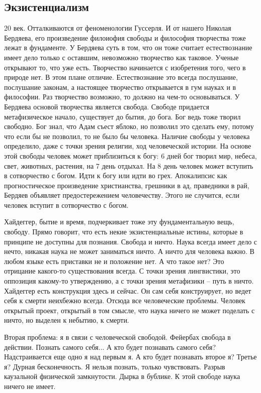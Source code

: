 \documentclass[a4paper, 12pt]{article}
\begin{document}
\subsection{Экзистенциализм}
20 век. Отталкиваются от феноменологии Гуссерля. И от нашего Николая 
Бердяева, его произведение филоиофия свободы и философия творчества тоже 
лежат в фундаменте. У Бердяева суть в том, что он тоже считает 
естествознание имеет дело только с оставшим, невозможно творчество как 
таковое. Ученые открывают то, что уже есть. Творчество начинается 
с изобретения того, чего в природе нет. В этом плане отличие. 
Естествознание это всегда послушание, послушание законам, а настоящее 
творчество открывается в гум науках и в философии. Раз творчество 
возможно, то должно на чем-то основываться. У Бердяева основой 
творчества является свобода. Свободе придается метафизическое начало, 
существует до бытия, до бога. Бог ведь тоже творил свободно. Бог знал, 
что Адам съест яблоко, но позволил это сделать ему, потому что если бы 
не позволил, то не было бы человека. Наличие свободы у человека 
определило, даже с точки зрения религии, ход человеческой истории. На 
основе этой свободы человек может приблизиться к богу: 6 дней бог творил 
мир, небеса, свет, животных, растения, на 7 день отдыхал. На 8 день 
человек может вступить в сотворчество с богом. Идти к богу или идти во 
грех. Апокалипсис как прогностическое произведение христианства, 
грешники в ад, праведники в рай, Бердяев объявляет предостережением 
человечеству. Этого не случится, если человек вступит в сотворчество 
с богом.

Хайдеггер, бытие и время, подчеркивает тоже эту фундаментальную вещь, 
свободу. Прямо говорит, что есть некие экзистенциальные истины, которые 
в принципе не доступны для познания. Свобода и ничто. Наука всегда имеет 
дело с нечто, никакая наука не может заниматься ничто. А ничто для 
человека важно. В любом языке есть приставки не и положение нет. А что 
такое нет? Это отрицание какого-то существования всегда. С точки зрения 
лингвистики, это оппозиция какому-то утверждению, а с точки зрения 
метафизики -- путь в ничто. Хайдеггер есть конструкция здесь и сейчас. 
Он сам себя конструирует, но ведет себя к смерти неихбежно всегда. 
Отсюда все человеческие проблемы. Человек открытый проект, открытый 
в том смысле, что наука ничего не может поделать с ничто, но выделен 
к небытию, к смерти.

Вторая проблема: я в связи с человеческой свободой. Фейербах свобода 
в действии. Познать самого себя... А кто будет познавать самого себя? 
Надстраивается еще одно я над первым я. А кто будет познавать второе я? 
Третье я? Дурная бесконечность. Я нельзя познать, только чувствовать. 
Разрыв каузальной физической замкнутости. Дырка в бублике. К этой 
свободе наука ничего не имеет.
\end{document}
